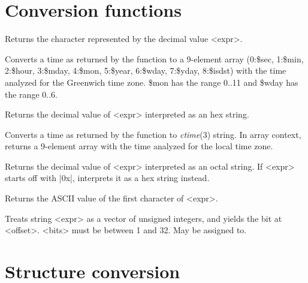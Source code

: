 \documentclass{refbase}
\begin{document}
\section{Conversion functions} 

\begin{enum}{1cm}

Returns the character represented by the decimal value <expr>.

Converts a time as returned by the  function to a 9-element
array (0:\$sec, 1:\$min, 2:\$hour, 3:\$mday, 4:\$mon, 5:\$year, 6:\$wday,
7:\$yday, 8:\$isdst) with the time analyzed for the Greenwich time zone.
\$mon has the range 0..11 and \$wday has the range 0..6.

Returns the decimal value of <expr> interpreted as an hex string.

Converts a time as returned by the  function to {\it ctime\/}(3)
string. In array context, returns a 9-element
array with the time analyzed for the local time zone. 

Returns the decimal value of <expr> interpreted as an octal string. If
<expr> starts off with |0x|, interprets it as a hex string instead.

Returns the ASCII value of the first character of <expr>.

Treats string <expr> as a vector of unsigned integers, and yields the bit at
<offset>. <bits> must be between 1 and 32. May be assigned to.

\end{enum}

\newpage

\section{Structure conversion} 
\end{document}
